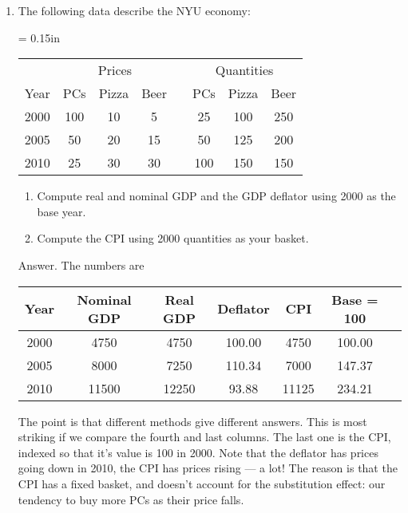 \documentclass[12pt,letterpaper]{article}
\begin{document}
\begin{enumerate}
\item The following data describe the NYU economy:
\begin{center}
\tabcolsep = 0.15in
\begin{tabular}{cccccccc}
\hline
  & \multicolumn{3}{c}{Prices} &&   \multicolumn{3}{c}{Quantities} \\
  \cline{2-4} \cline{6-8}
Year  &  PCs  &  Pizza  &  Beer  && PCs  &  Pizza  &  Beer  \\
\hline
2000  &  100 & 10 & 5 && 25 & 100 & 250  \\
2005  &  50  & 20 & 15 && 50 & 125 & 200 \\
2010  &  25  & 30 & 30 && 100 & 150 & 150 \\
\hline
\end{tabular}
\end{center}
\begin{enumerate}
\item Compute real and nominal GDP and the GDP deflator using
2000 as the base year.
\item Compute the CPI using 2000 quantities as your basket.
\end{enumerate}
Answer.  The numbers are
\begin{center}
\begin{tabular}{ccccccc}
\hline
Year  &  Nominal GDP & Real GDP & Deflator  & CPI  & Base = 100 \\
\hline
2000 & 4750  & 4750 & 100.00 &  4750 & 100.00 \\
2005 & 8000 & 7250  & 110.34  & 7000 & 147.37  \\
2010 & 11500  & 12250 & 93.88 & 11125 & 234.21 \\
\hline
\end{tabular}
\end{center}
The point is that different methods give different answers.
This is most striking if we compare the fourth and last columns.
The last one is the CPI, indexed so that it's value is 100 in 2000.
Note that the deflator has prices going down in 2010,
the CPI has prices rising --- a lot!
The reason is that the CPI has a fixed basket,
and doesn't account for the substitution effect:
our tendency to buy more PCs as their price falls.



\end{enumerate}
\end{document}
